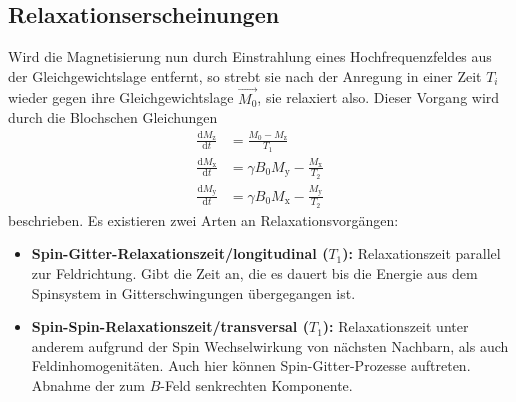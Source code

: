 \subsection{Relaxationserscheinungen}
Wird die Magnetisierung nun durch Einstrahlung eines Hochfrequenzfeldes
aus der Gleichgewichtslage entfernt, so strebt sie nach der Anregung in einer Zeit $T_{i}$
wieder gegen ihre Gleichgewichtslage $\vec{M_{0}}$, sie relaxiert also.
Dieser Vorgang wird durch die Blochschen Gleichungen
\begin{align}
		\frac{\text{d} M_\text{z}}{\text{d} t} &= \frac{M_0 - M_\text{z}}{T_1} \\
		\frac{\text{d} M_\text{x}}{\text{d} t} &= \gamma B_0 M_\text{y} -
		\frac{M_\text{x}}{T_2} \\
		\frac{\text{d} M_\text{y}}{\text{d} t} &= \gamma B_0 M_\text{x} - \frac{M_\text{y}}{T_2}
\end{align}
beschrieben.
Es existieren zwei Arten an Relaxationsvorgängen:
\begin{itemize}
		\item \textbf{Spin-Gitter-Relaxationszeit/longitudinal ($T_{1}$):}
				Relaxationszeit parallel zur Feldrichtung. Gibt die Zeit
				an, die es dauert bis die Energie aus dem Spinsystem in Gitterschwingungen
				übergegangen ist.
		\item \textbf{Spin-Spin-Relaxationszeit/transversal ($T_{1}$):} Relaxationszeit
				unter anderem aufgrund der Spin Wechselwirkung von nächsten
				Nachbarn, als auch Feldinhomogenitäten. Auch hier können Spin-Gitter-Prozesse
        auftreten. Abnahme der zum $B$-Feld senkrechten Komponente.
\end{itemize}

